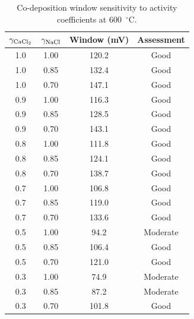 \documentclass[pdflatex,sn-basic,Numbered]{sn-jnl}
\begin{document}
\begin{table}[!ht]
\centering
\footnotesize
\caption{Co-deposition window sensitivity to activity coefficients at 600~$^{\circ}$C.}
\label{tab:window_sens}
\begin{tabular}{cccc}
\toprule
$\gamma_{\ce{CaCl2}}$ & $\gamma_{\ce{NaCl}}$ & Window (mV) & Assessment \\
\midrule
1.0 & 1.00 & 120.2 & Good \\
1.0 & 0.85 & 132.4 & Good \\
1.0 & 0.70 & 147.1 & Good \\
0.9 & 1.00 & 116.3 & Good \\
0.9 & 0.85 & 128.5 & Good \\
0.9 & 0.70 & 143.1 & Good \\
0.8 & 1.00 & 111.8 & Good \\
0.8 & 0.85 & 124.1 & Good \\
0.8 & 0.70 & 138.7 & Good \\
0.7 & 1.00 & 106.8 & Good \\
0.7 & 0.85 & 119.0 & Good \\
0.7 & 0.70 & 133.6 & Good \\
0.5 & 1.00 & 94.2 & Moderate \\
0.5 & 0.85 & 106.4 & Good \\
0.5 & 0.70 & 121.0 & Good \\
0.3 & 1.00 & 74.9 & Moderate \\
0.3 & 0.85 & 87.2 & Moderate \\
0.3 & 0.70 & 101.8 & Good \\
\bottomrule
\end{tabular}
\end{table}
\end{document}
